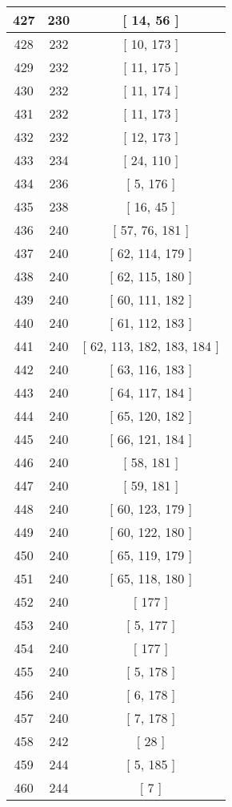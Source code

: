 \begin{center}
\begin{longtable}[H]{|| c c c ||}
\hline
427 & 230 & [ 14, 56 ] \\ 
\hline
428 & 232 & [ 10, 173 ] \\ 
\hline
429 & 232 & [ 11, 175 ] \\ 
\hline
430 & 232 & [ 11, 174 ] \\ 
\hline
431 & 232 & [ 11, 173 ] \\ 
\hline
432 & 232 & [ 12, 173 ] \\ 
\hline
433 & 234 & [ 24, 110 ] \\ 
\hline
434 & 236 & [ 5, 176 ] \\ 
\hline
435 & 238 & [ 16, 45 ] \\ 
\hline
436 & 240 & [ 57, 76, 181 ] \\ 
\hline
437 & 240 & [ 62, 114, 179 ] \\ 
\hline
438 & 240 & [ 62, 115, 180 ] \\ 
\hline
439 & 240 & [ 60, 111, 182 ] \\ 
\hline
440 & 240 & [ 61, 112, 183 ] \\ 
\hline
441 & 240 & [ 62, 113, 182, 183, 184 ] \\ 
\hline
442 & 240 & [ 63, 116, 183 ] \\ 
\hline
443 & 240 & [ 64, 117, 184 ] \\ 
\hline
444 & 240 & [ 65, 120, 182 ] \\ 
\hline
445 & 240 & [ 66, 121, 184 ] \\ 
\hline
446 & 240 & [ 58, 181 ] \\ 
\hline
447 & 240 & [ 59, 181 ] \\ 
\hline
448 & 240 & [ 60, 123, 179 ] \\ 
\hline
449 & 240 & [ 60, 122, 180 ] \\ 
\hline
450 & 240 & [ 65, 119, 179 ] \\ 
\hline
451 & 240 & [ 65, 118, 180 ] \\ 
\hline
452 & 240 & [ 177 ] \\ 
\hline
453 & 240 & [ 5, 177 ] \\ 
\hline
454 & 240 & [ 177 ] \\ 
\hline
455 & 240 & [ 5, 178 ] \\ 
\hline
456 & 240 & [ 6, 178 ] \\ 
\hline
457 & 240 & [ 7, 178 ] \\ 
\hline
458 & 242 & [ 28 ] \\ 
\hline
459 & 244 & [ 5, 185 ] \\ 
\hline
460 & 244 & [ 7 ] \\ 

\end{longtable}
\end{center}
